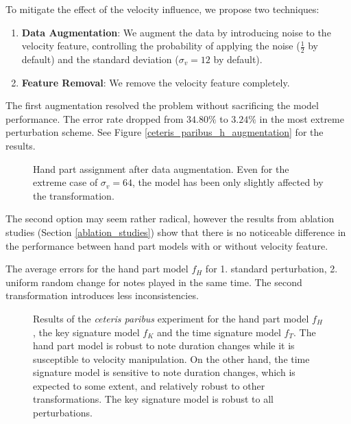 To mitigate the effect of the velocity influence, we propose two techniques: \begin{enumerate}
	\item {\bf Data Augmentation}: We augment the data by introducing noise to the velocity feature, controlling the probability of applying the noise ($\tfrac{1}{2}$ by default) and the standard deviation ($\sigma_v = 12$ by default).
	\item {\bf Feature Removal}: We remove the velocity feature completely.
\end{enumerate}

The first augmentation resolved the problem without sacrificing the model performance. The error rate dropped from $34.80\%$ to $3.24\%$ in the most extreme perturbation scheme. See Figure \ref{ceteris_paribus_h_augmentation} for the results.

\begin{figure}[ht!]
\centering

\caption[Hand part assignment after data augmentation.]{Hand part assignment after data augmentation. Even for the extreme case of $\sigma_v = 64$, the model has been only slightly affected by the transformation.}
\label{ceteris_paribus}
\end{figure}

The second option may seem rather radical, however the results from ablation studies (Section \ref{ablation_studies}) show that there is no noticeable difference in the performance between hand part models with or without velocity feature.

\begin{table}[ht!]

\caption[The average errors for the hand part model.]{The average errors for the hand part model $f_H$ for 1. standard perturbation, 2. uniform random change for notes played in the same time. The second transformation introduces less inconsistencies.}
\label{hand_part_perturbations}
\end{table} 

\begin{figure}[ht!]
\centering



\caption[Results of the \emph{ceteris paribus} experiment.]{Results of the \emph{ceteris paribus} experiment for the hand part model $f_H$, the key signature model $f_K$ and the time signature model $f_T$. The hand part model is robust to note duration changes while it is susceptible to velocity manipulation. On the other hand, the time signature model is sensitive to note duration changes, which is expected to some extent, and relatively robust to other transformations. The key signature model is robust to all perturbations.}
\label{ceteris_paribus}
\end{figure}

